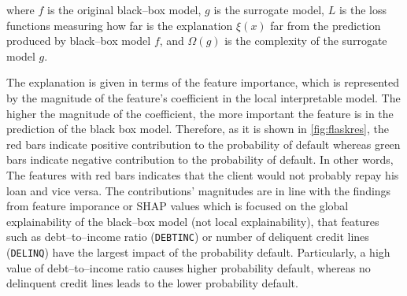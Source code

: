 where $f$ is the original black--box model, $g$ is the surrogate model, $L$ is the loss functions measuring how far is the explanation $\xi(x)$ far from the prediction produced by black--box model $f$, and $\Omega(g)$ is the complexity of the surrogate model $g$.


The explanation is given in terms of the feature importance, which is represented by the magnitude of the feature's coefficient in the local interpretable model. The higher the magnitude of the coefficient, the more important the feature is in the prediction of the black box model.
Therefore, as it is shown in \autoref{fig:flaskres}, the red bars indicate positive contribution to the probability of default whereas green bars indicate negative contribution to the probability of default. In other words, The features with red bars indicates that the client would not probably repay his loan and vice versa.
The contributions' magnitudes are in line with the findings from feature imporance or SHAP values which is focused on the global explainability of the black--box model (not local explainability), that features such as debt--to--income ratio (\texttt{DEBTINC}) or number of deliquent credit lines (\texttt{DELINQ}) have the largest impact of the probability default.
Particularly, a high value of debt--to--income ratio causes higher probability default, whereas no delinquent credit lines leads to the lower probability default.
